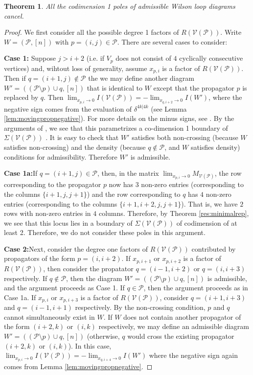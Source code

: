 \documentclass[11pt]{article}
\newcommand{\cP}{\mathcal{P}}
\newcommand{\cV}{\mathcal{V}}
\newcommand{\VP}{\cV(\cP)}
\newtheorem{thm}{Theorem}[section]
\theoremstyle{remark}
\theoremstyle{definition}
\begin{document}
\begin{thm} \label{res:deg1polescancel}
All the codimension 1 poles of admissible Wilson loop diagrams cancel.
\end{thm}

\begin{proof}

We first consider all the possible degree 1 factors of $R(\VP)$. Write $W = (\cP, [n])$ with $p= (i,j)  \in \cP$. There are several cases to consider:

\textbf{Case 1:} Suppose $j > i+2$ (i.e. if $V_p$ does not consist of $4$ cyclically consecutive vertices) and, wihtout loss of generality, assume $x_{p, i}$ is a factor of $R(\VP)$. Then if $q = (i+1, j) \not \in \cP$ the we may define another diagram $W' = ((\cP \setminus p) \cup q, [n])$ that is identical to $W$ except that the propagator $p$ is replaced by $q$. Then $\lim_{x_{p, i} \rightarrow 0} I(\VP) = -\lim_{x_{q, i+2} \rightarrow 0} I(W')$, where the negative sign comes from the evaluation of $\delta^{4k|4k}$ (see Lemma \ref{lem:movingpropnegative}). For more details on the minus signs, see \cite{casestudy, HeslopSteward, correlahedron}. By the arguments of \cite{basisshapeloci}, we see that this parametrizes a co-dimension 1 boundary of $\Sigma(\VP)$ . It is easy to check that $W'$ satisfies both non-crossing (because $W$ satisfies non-crossing) and the density (because $q \not \in \cP$, and $W$ satisfies density) conditions for admissibility. Therefore $W'$ is admissible. 

\textbf{Case 1a:}If $q = (i+1, j) \in \cP$, then, in the matrix $\lim_{x_{p, i} \rightarrow 0}M_{\VP}$, the row corresponding to the propagator $p$ now has 3 non-zero entries (corresponding to the columns $\{i+1, j, j+1\}$) and the row corresponding to $q$ has $4$ non-zero entries (corresponding to the columns $\{i+1, i+2, j, j+1\}$). That is, we have $2$ rows with non-zero entries in $4$ columns. Therefore, by Theorem \ref{res:minimalrep}, we see that this locus lies in a boundary of $\Sigma(\VP)$ of codimension of at least 2. Therefore, we do not consider these poles in this argument. 

\textbf{Case 2:}Next, consider the degree one factors of $R(\VP)$ contributed by propagators of the form $p = (i, i+2)$. If $x_{p, i+1}$ or $x_{p, i+2}$ is a factor of $R(\VP)$, then consider the propatator $q = (i-1, i+2)$ or $q = (i, i+3)$ respectively. If $q \not \in \cP$, then the diagram $W' = ((\cP \setminus p)\cup q, [n])$ is admissible, and the argument proceeds as Case 1. If $q \in \cP$, then the argument proceeds as in Case 1a.  If $x_{p, i}$ or $x_{p, i+3}$ is a factor of $R(\VP)$, consider $q = (i+1, i+3)$ and $q = (i-1, i+1)$ respectively. By the non-crossing condition, $p$ and $q$ cannot simultaneously exist in $W$. If $W$ does not contain another propagator of the form $(i+2, k)$ or $(i, k)$ respectively, we may define an admissible diagram $W' = ((\cP \setminus p)\cup q, [n])$ (otherwise, $q$ would cross the existing propagator $(i+2, k)$ or $(i, k)$).  In this case, $\lim_{x_{p, i} \rightarrow 0} I(\VP) = -\lim_{x_{q, i+4} \rightarrow 0} I(W')$ where the negative sign again comes from Lemma \ref{lem:movingpropnegative}.


\end{proof}
\end{document}
